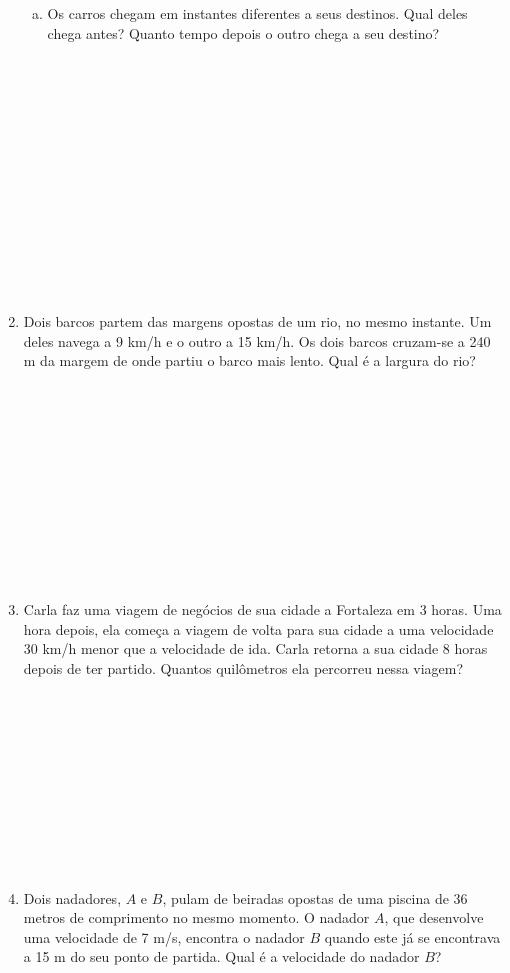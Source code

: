 \documentclass[a4paper,14pt]{article}
\begin{document}
\begin{multicols}{2}
\begin{enumerate}
\begin{enumerate}[a)]
    			\item Os carros chegam em instantes diferentes a seus destinos. Qual deles chega antes? Quanto tempo depois o outro chega a seu destino? \\\\\\\\\\\\\\\\\\\\\\\\\\\\
    		\end{enumerate}
    	    \item Dois barcos partem das margens opostas de um rio, no mesmo instante. Um deles navega a 9 km/h e o outro a 15 km/h. Os dois barcos cruzam-se a 240 m da margem de onde partiu o barco mais lento. Qual é a largura do rio?  \\\\\\\\\\\\\\\\\\\\\\\\
    	    \item Carla faz uma viagem de negócios de sua cidade a Fortaleza em 3 horas. Uma hora depois, ela começa a viagem de volta para sua cidade a uma velocidade 30 km/h menor que a velocidade de ida. Carla retorna a sua cidade 8 horas depois de ter partido. Quantos quilômetros ela percorreu nessa viagem?  \\\\\\\\\\\\\\\\\\\\\\
    	    \item Dois nadadores, $A$ e $B$, pulam de beiradas opostas de uma piscina de 36 metros de comprimento no mesmo momento. O nadador $A$, que desenvolve uma velocidade de 7 m/s, encontra o nadador $B$ quando este já se encontrava a 15 m do seu ponto de partida. Qual é a velocidade do nadador $B$?  \\\\\\\\\\\\\\\\\\\\\\

\end{enumerate}
\end{multicols}
\end{document}
